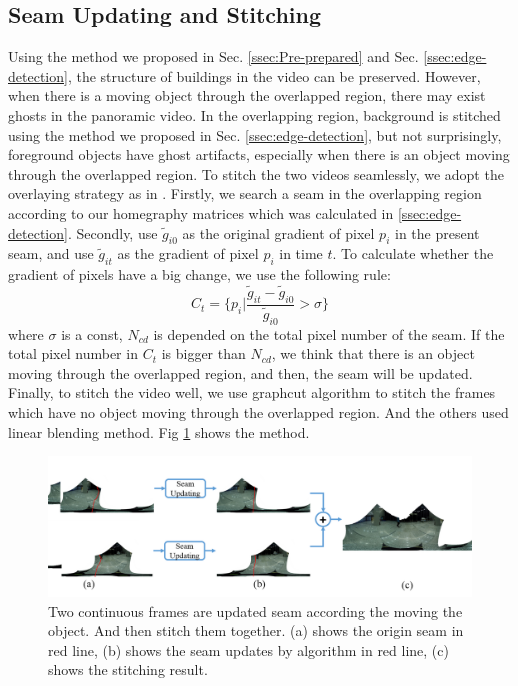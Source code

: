 \documentclass[conference]{IEEEtran}
\begin{document}
\subsection{Seam Updating and Stitching}
\label{ssec:stitching}

Using the method we proposed in Sec. \ref{ssec:Pre-prepared} and Sec. \ref{ssec:edge-detection}, the structure of buildings in the video can be preserved. However, when there is a moving object
through the overlapped region, there may exist ghosts in the panoramic video. 
In the overlapping region, background is stitched using the method we proposed in Sec. \ref{ssec:edge-detection}, but not surprisingly, 
foreground objects have ghost artifacts, especially when there is an object moving through the overlapped region. To stitch the
two videos seamlessly, we adopt the overlaying strategy as in \cite{he2016parallax}. Firstly, we search a seam in the overlapping region according to our homegraphy matrices which was calculated in \ref{ssec:edge-detection}.
Secondly, use $\widetilde{g}_{i0}$ as the original gradient of pixel $p_i$ in the present seam, and use $\widetilde{g}_{it}$ as the gradient of pixel $p_i$ in time $t$. To calculate whether the gradient
of pixels have a big change, we use the following rule:
$$
\textit{C}_{t}=\{p_{i}|\frac{\widetilde{g}_{it}-\widetilde{g}_{i0}}{\widetilde{g}_{i0}}>\sigma\}
$$
where $\sigma$ is a const, $\textit{N}_{cd}$ is depended on the total pixel number of the seam. If the total pixel number in $\textit{C}_t$ is bigger than $\textit{N}_{cd}$, we think that there is an object moving through the overlapped region, and then, the seam will be updated.
Finally, to stitch the video well, we use graphcut algorithm \cite{boykov2004experimental} to stitch the frames which have no object moving through the overlapped region. And the others used linear blending method.
Fig \ref{fig:p24} shows the method.
\begin{figure}[h]
\centering
\includegraphics[scale=0.21]{picture43.png}
\caption{Two continuous frames are updated seam according the moving the object. And then stitch them together. (a) shows the origin seam in red line, (b) shows the seam updates 
by algorithm \cite{he2016parallax} in red line,
(c) shows the stitching result.}
\label{fig:p24}
\end{figure}
\end{document}
